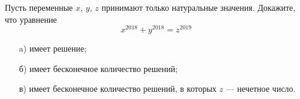 
Пусть переменные $x$, $y$, $z$ принимают только натуральные значения. Докажите, что уравнение 
$$x^{2018}+y^{2018}=z^{2019}
$$

\begin{enumerate}
    \item[a)] имеет решение;
    \item[б)] имеет бесконечное количество решений;
    \item[в)] имеет бесконечное количество решений, в которых $z$ --- нечетное число.
\end{enumerate}
